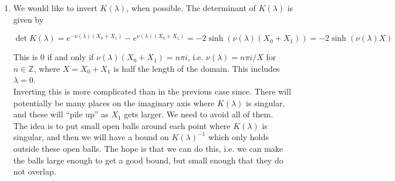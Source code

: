 \documentclass[12pt]{article}
\def\Z{{\mathbb Z}}
\newtheorem{hypothesis}{Hypothesis}
\begin{document}
\begin{enumerate}
\begin{align*}
||K(\lambda)|| &= \mathcal{O}( e^{|\nu(\lambda)|X_0} + e^{|\nu(\lambda)|X_1} ) \\
 &= \mathcal{O} (1 + |\nu(\lambda)X_0| + |\nu(\lambda)X_1 |+ (|\nu(\lambda)X_0|^2 + (|\nu(\lambda)X_1|^2)) \\
&= \mathcal{O}( 1 + |1/c_0| |\tilde{\lambda} | e^{-\alpha X_0} X_0 + |1/c_0| |\tilde{\lambda} | e^{-\alpha X_0} X_1) \\ 
&= \mathcal{O}( 1 + e^{-\alpha X_0}(X_0 + X_1) ) \\
&= \mathcal{O}\left( 1 + e^{-\alpha X_0}X_0\left( 1 + \frac{X_1}{X_0} \right) \right)  
\end{align*}

For now, we take the following hypothesis regarding the lengths $X_0$ and $X_1$.

\begin{hypothesis}\label{X0X1} $X_0$ is sufficiently large so that
\[
e^{-\alpha X_0}X_0\left( 1 + \frac{X_1}{X_0} \right) = \mathcal{O}(1)
\]
\end{hypothesis}

With this hypothesis, $||K(\lambda)|| = \mathcal{O}(1)$.

\item We would like to invert $K(\lambda)$, when possible. The determinant of $K(\lambda)$ is given by

\[
\det K(\lambda) = e^{-\nu(\lambda)(X_0+X_1)} - e^{\nu(\lambda)(X_0+X_1)} = -2 \sinh(\nu(\lambda)(X_0+X_1)) = -2 \sinh(\nu(\lambda)X)
\]

This is 0 if and only if $\nu(\lambda)(X_0+X_1) = n \pi i$, i.e. $\nu(\lambda) = n \pi i / X$ for $n \in \Z$, where $X = X_0 + X_1$ is half the length of the domain. This includes $\lambda = 0$.\\

Inverting this is more complicated than in the previous case since. There will potentially be many places on the imaginary axis where $K(\lambda)$ is singular, and these will ``pile up'' as $X_1$ gets larger. We need to avoid all of them. \\

The idea is to put small open balls around each point where $K(\lambda)$ is singular, and then we will have a bound on $K(\lambda)^{-1}$ which only holds outside these open balls. The hope is that we can do this, i.e. we can make the balls large enough to get a good bound, but small enough that they do not overlap.\\


\end{enumerate}
\end{document}
